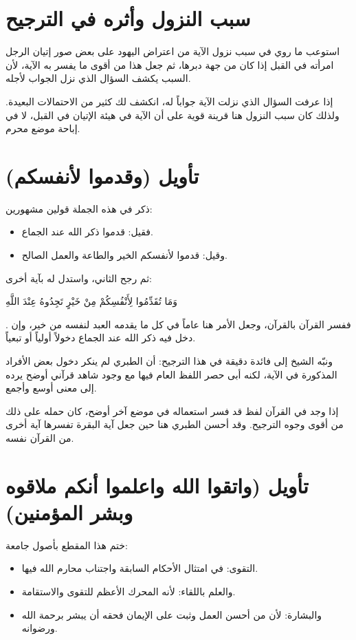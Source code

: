 \section{سبب النزول وأثره في الترجيح}
استوعب  ما روي في سبب نزول الآية من اعتراض اليهود على بعض صور إتيان الرجل امرأته في القبل إذا كان من جهة دبرها، ثم جعل هذا من أقوى ما يفسر به الآية، لأن السبب يكشف السؤال الذي نزل الجواب لأجله.

\begin{fawaid}
إذا عرفت السؤال الذي نزلت الآية جواباً له، انكشف لك كثير من الاحتمالات البعيدة. ولذلك كان سبب النزول هنا قرينة قوية على أن الآية في هيئة الإتيان في القبل، لا في إباحة موضع محرم.
\end{fawaid}

\section{تأويل (وقدموا لأنفسكم)}
ذكر  في هذه الجملة قولين مشهورين:
\begin{itemize}
    \item فقيل: قدموا ذكر الله عند الجماع.
    \item وقيل: قدموا لأنفسكم الخير والطاعة والعمل الصالح.
\end{itemize}

ثم رجح الثاني، واستدل له بآية أخرى: \begin{ayah}وَمَا تُقَدِّمُوا لِأَنْفُسِكُمْ مِنْ خَيْرٍ تَجِدُوهُ عِنْدَ اللَّهِ\end{ayah}. ففسر القرآن بالقرآن، وجعل الأمر هنا عاماً في كل ما يقدمه العبد لنفسه من خير، وإن دخل فيه ذكر الله عند الجماع دخولاً أولياً أو تبعياً.

ونبّه الشيخ إلى فائدة دقيقة في هذا الترجيح: أن الطبري لم ينكر دخول بعض الأفراد المذكورة في الآية، لكنه أبى حصر اللفظ العام فيها مع وجود شاهد قرآني أوضح يرده إلى معنى أوسع وأجمع.

\begin{fawaid}
إذا وجد في القرآن لفظ قد فسر استعماله في موضع آخر أوضح، كان حمله على ذلك من أقوى وجوه الترجيح. وقد أحسن الطبري هنا حين جعل آية البقرة تفسرها آية أخرى من القرآن نفسه.
\end{fawaid}

\separator

\section{تأويل (واتقوا الله واعلموا أنكم ملاقوه وبشر المؤمنين)}
ختم  هذا المقطع بأصول جامعة:
\begin{itemize}
    \item التقوى: في امتثال الأحكام السابقة واجتناب محارم الله فيها.
    \item والعلم باللقاء: لأنه المحرك الأعظم للتقوى والاستقامة.
    \item والبشارة: لأن من أحسن العمل وثبت على الإيمان فحقه أن يبشر برحمة الله ورضوانه.
\end{itemize}

